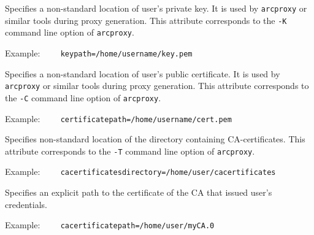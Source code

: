 {}
\hspace*{0.5cm}
\begin{shaded}
\end{shaded}

Specifies a non-standard location of user's private key. It is used by
\texttt{arcproxy} or similar tools during proxy generation. This attribute
corresponds to the \verb#-K# command line option of \texttt{arcproxy}.

Example:
\verb#    keypath=/home/username/key.pem#

{}
\hspace*{0.5cm}
\begin{shaded}
\end{shaded}

Specifies a non-standard location of user's public certificate. It is used by
\texttt{arcproxy} or similar tools during proxy generation. This attribute
corresponds to the \verb#-C# command line option of \texttt{arcproxy}.

Example:
\verb#    certificatepath=/home/username/cert.pem#

{}
\hspace*{0.5cm}
\begin{shaded}
\end{shaded}

Specifies non-standard location of the directory containing CA-certificates.
This attribute
corresponds to the \verb#-T# command line option of \texttt{arcproxy}.

Example:
\verb#    cacertificatesdirectory=/home/user/cacertificates#

{}
\hspace*{0.5cm}
\begin{shaded}
\end{shaded}

Specifies an explicit path to the certificate of the CA that issued user's credentials.

Example:
\verb#    cacertificatepath=/home/user/myCA.0#

